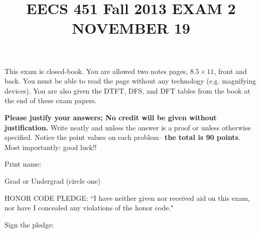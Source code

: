 \documentclass[]{siamltex}
\title{EECS 451 Fall 2013 EXAM 2 \hspace{1.2cm} NOVEMBER 19}
\begin{document}
%
\maketitle
This exam is closed-book. You are allowed two notes pages, $8.5 \times 11$, front and back. You must be able to read the page without any technology (e.g. magnifying devices). You are also given the DTFT, DFS, and DFT tables from the book at the end of these exam papers.

\vspace{4mm} \textbf{Please justify your answers; No credit will be given without justification.} Write neatly and  unless the answer is a proof or unless otherwise specified. Notice the point values on each problem-- \textbf{the total is 90 points}. Most importantly: good luck!!

\vspace{1cm}
Print name: \makebox[3in]{\hrulefill} 

\vspace{4mm}
Grad or Undergrad (circle one)

\vspace{4mm}
HONOR CODE PLEDGE:
``I have neither given nor received aid on this exam, nor have I
concealed any violations of the honor code."

\vspace{4mm}
Sign the pledge: \makebox[3in]{\hrulefill} 
\vspace{1cm}
\end{document}
